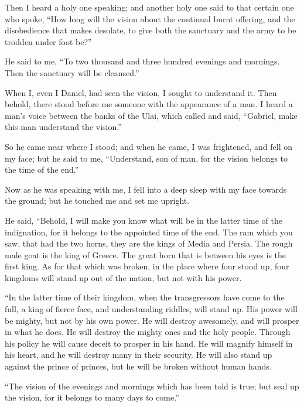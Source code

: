  Then I heard a holy one speaking; and another holy one
said to that certain one who spoke, ``How long will the vision about the
continual burnt offering, and the disobedience that makes desolate, to
give both the sanctuary and the army to be trodden under foot be?''

 He said to me, ``To two thousand and three hundred
evenings and mornings. Then the sanctuary will be cleansed.''

 When I, even I Daniel, had seen the vision, I sought to
understand it. Then behold, there stood before me someone with the
appearance of a man.  I heard a man's voice between the
banks of the Ulai, which called and said, ``Gabriel, make this man
understand the vision.''

 So he came near where I stood; and when he came, I was
frightened, and fell on my face; but he said to me, ``Understand, son of
man, for the vision belongs to the time of the end.''

 Now as he was speaking with me, I fell into a deep sleep
with my face towards the ground; but he touched me and set me upright.

 He said, ``Behold, I will make you know what will be in
the latter time of the indignation, for it belongs to the appointed time
of the end.  The ram which you saw, that had the two
horns, they are the kings of Media and Persia.  The rough
male goat is the king of Greece. The great horn that is between his eyes
is the first king.  As for that which was broken, in the
place where four stood up, four kingdoms will stand up out of the
nation, but not with his power.

 ``In the latter time of their kingdom, when the
transgressors have come to the full, a king of fierce face, and
understanding riddles, will stand up.  His power will be
mighty, but not by his own power. He will destroy awesomely, and will
prosper in what he does. He will destroy the mighty ones and the holy
people.  Through his policy he will cause deceit to
prosper in his hand. He will magnify himself in his heart, and he will
destroy many in their security. He will also stand up against the prince
of princes, but he will be broken without human hands.

 ``The vision of the evenings and mornings which has been
told is true; but seal up the vision, for it belongs to many days to
come.''

